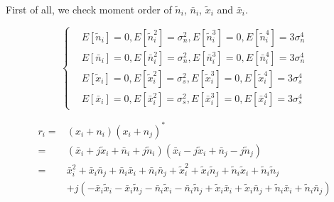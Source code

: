 First of all, we check moment order of $\tilde{n}_i$, $\bar{n}_i$, $\tilde{x}_i$ and $\bar{x}_i$.

\begin{equation}
  \begin{cases}
    &E[\tilde{n}_i] = 0, E[\tilde{n}_i^2] = \sigma_{n}^2, E[\tilde{n}_i^3] = 0, E[\tilde{n}_i^4]= 3\sigma_n^4\\
    &E[\bar{n}_i] = 0,   E[\bar{n}_i^2] = \sigma_n^2, E[\bar{n}_i^3] = 0, E[\bar{n}_i^4]=3\sigma_n^4\\
    &E[\tilde{x}_i] = 0, E[\tilde{x}_i^2] = \sigma_{s}^2, E[\tilde{x}_i^3] = 0, E[\tilde{x}_i^4] = 3\sigma_s^4\\
    &E[\bar{x}_i] = 0, E[\bar{x}_i^2] = \sigma_s^2, E[\bar{x}_i^3] = 0, E[\bar{x}_i^4] = 3\sigma_s^4
  \end{cases}
  \label{equ:momentfun}
\end{equation}

\begin{equation}
  \begin{split}
    r_i = &(x_i+n_i)(x_i + n_j)^\ast\\
    = &(\bar{x}_i+j\tilde{x}_i + \bar{n}_i+j\tilde{n}_i)(\bar{x}_i-j\tilde{x}_i + \bar{n}_j-j\tilde{n}_j)\\
    = &\bar{x}_i^2 + \bar{x}_i\bar{n}_j+\bar{n}_i\bar{x}_i+\bar{n}_i\bar{n}_j + \tilde{x}_i^2 + \tilde{x}_i\tilde{n}_j + \tilde{n}_i\tilde{x}_i + \tilde{n}_i\tilde{n}_j\\
    &+ j( -\bar{x}_i\tilde{x}_i - \bar{x}_i\tilde{n}_j - \bar{n}_i\tilde{x}_i - \bar{n}_i\tilde{n}_j + \tilde{x}_i\bar{x}_i + \tilde{x}_i\bar{n}_j + \tilde{n}_i\bar{x}_i + \tilde{n}_i\bar{n}_j)
  \end{split}
\end{equation}

